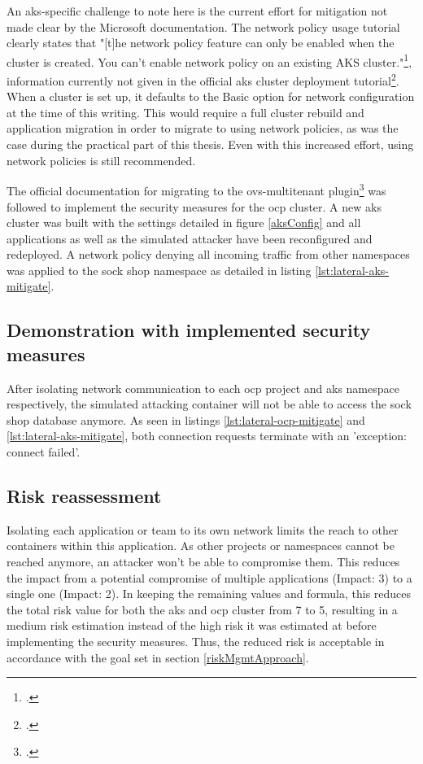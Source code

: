 An \gls{aks}-specific challenge to note here is the current effort for mitigation not made clear by the Microsoft documentation. The network policy usage tutorial clearly states that "[t]he network policy feature can only be enabled when the cluster is created. You can't enable network policy on an existing AKS cluster."\footcite[][, section 'Frequently asked questions']{aksNetPolUse}, information currently not given in the official \gls{aks} cluster deployment tutorial\footcite{aksSetup}. When a cluster is set up, it defaults to the Basic option for network configuration at the time of this writing. This would require a full cluster rebuild and application migration in order to migrate to using network policies, as was the case during the practical part of this thesis.
Even with this increased effort, using network policies is still recommended.

The official documentation for migrating to the ovs-multitenant plugin\footcite{networkPluginSwitch} was followed to implement the security measures for the \gls{ocp} cluster. A new \gls{aks} cluster was built with the settings detailed in figure \ref{aksConfig} and all applications as well as the simulated attacker have been reconfigured and redeployed. A network policy denying all incoming traffic from other namespaces was applied to the sock shop namespace as detailed in listing \ref{lst:lateral-aks-mitigate}.

\subsection{Demonstration with implemented security measures}

After isolating network communication to each \gls{ocp} project and \gls{aks} namespace respectively, the simulated attacking container will not be able to access the sock shop database anymore. As seen  in listings \ref{lst:lateral-ocp-mitigate} and \ref{lst:lateral-aks-mitigate}, both connection requests terminate with an 'exception: connect failed'.

\subsection{Risk reassessment}

Isolating each application or team to its own network limits the reach to other containers within this application. As other projects or namespaces cannot be reached anymore, an attacker won't be able to compromise them. This reduces the impact from a potential compromise of multiple applications (Impact: 3) to a single one (Impact: 2).
In keeping the remaining values and formula, this reduces the total risk value for both the \gls{aks} and \gls{ocp} cluster from 7 to 5, resulting in a medium risk estimation instead of the high risk it was estimated at before implementing the security measures. Thus, the reduced risk is acceptable in accordance with the goal set in section \ref{riskMgmtApproach}.

